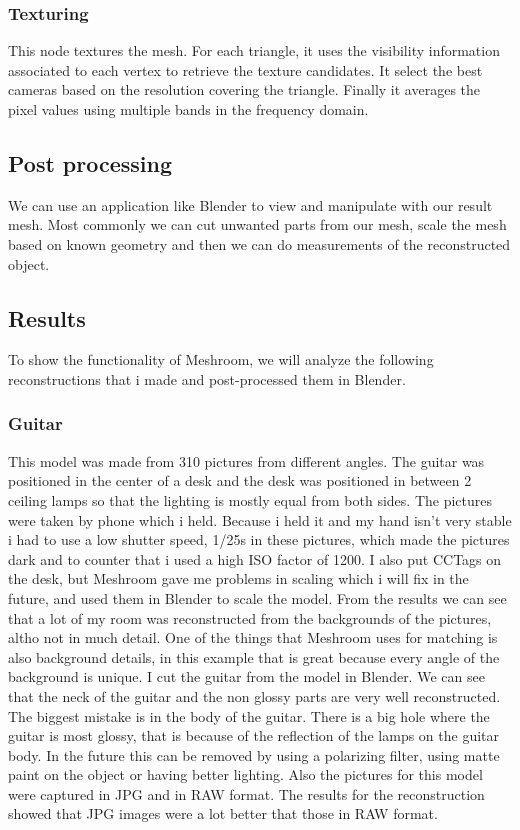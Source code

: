 \subsubsection{Texturing}
    This node textures the mesh. For each triangle, it uses the visibility information associated to each vertex to retrieve the texture candidates. It select the best cameras based on the resolution covering the triangle. Finally it averages the pixel values using multiple bands in the frequency domain. 

\subsection{Post processing}
    We can use an application like Blender to view and manipulate with our result mesh. Most commonly we can cut unwanted parts from our mesh, scale the mesh based on known geometry and then we can do measurements of the reconstructed object. 

\subsection{Results}
    To show the functionality of Meshroom, we will analyze the following reconstructions that i made and post-processed them in Blender.

    \subsubsection{Guitar}
    This model was made from 310 pictures from different angles. The guitar was positioned in the center of a desk and the desk was positioned in between 2 ceiling lamps so that the lighting is mostly equal from both sides. The pictures were taken by phone which i held. Because i held it and my hand isn't very stable i had to use a low shutter speed, 1/25s in these pictures, which made the pictures dark and to counter that i used a high ISO factor of 1200. I also put CCTags on the desk, but Meshroom gave me problems in scaling which i will fix in the future, and used them in Blender to scale the model. From the results we can see that a lot of my room was reconstructed from the backgrounds of the pictures, altho not in much detail. One of the things that Meshroom uses for matching is also background details, in this example that is great because every angle of the background is unique. I cut the guitar from the model in Blender. We can see that the neck of the guitar and the non glossy parts are very well reconstructed. The biggest mistake is in the body of the guitar. There is a big hole where the guitar is most glossy, that is because of the reflection of the lamps on the guitar body. In the future this can be removed by using a polarizing filter, using matte paint on the object or having better lighting. Also the pictures for this model were captured in JPG and in RAW format. The results for the reconstruction showed that JPG images were a lot better that those in RAW format. 
    
